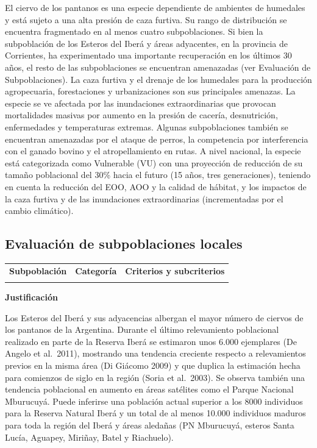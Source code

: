 \documentclass[
]{article}
\begin{document}
El ciervo de los pantanos es una especie dependiente de ambientes de
humedales y está sujeto a una alta presión de caza furtiva. Su rango de
distribución se encuentra fragmentado en al menos cuatro subpoblaciones.
Si bien la subpoblación de los Esteros del Iberá y áreas adyacentes, en
la provincia de Corrientes, ha experimentado una importante recuperación
en los últimos 30 años, el resto de las subpoblaciones se encuentran
amenazadas (ver Evaluación de Subpoblaciones). La caza furtiva y el
drenaje de los humedales para la producción agropecuaria, forestaciones
y urbanizaciones son sus principales amenazas. La especie se ve afectada
por las inundaciones extraordinarias que provocan mortalidades masivas
por aumento en la presión de cacería, desnutrición, enfermedades y
temperaturas extremas. Algunas subpoblaciones también se encuentran
amenazadas por el ataque de perros, la competencia por interferencia con
el ganado bovino y el atropellamiento en rutas. A nivel nacional, la
especie está categorizada como Vulnerable (VU) con una proyección de
reducción de su tamaño poblacional del 30\% hacia el futuro (15 años,
tres generaciones), teniendo en cuenta la reducción del EOO, AOO y la
calidad de hábitat, y los impactos de la caza furtiva y de las
inundaciones extraordinarias (incrementadas por el cambio climático).

\hypertarget{evaluaciuxf3n-de-subpoblaciones-locales}{%
\subsection{\texorpdfstring{\textbf{Evaluación de subpoblaciones
locales}}{Evaluación de subpoblaciones locales}}\label{evaluaciuxf3n-de-subpoblaciones-locales}}

\begin{tabu} to 
\toprule
\textbf{Subpoblación} & \textbf{Categoría} & \textbf{Criterios y subcriterios}\\
\midrule
{} &  & \\
\bottomrule
\end{tabu}

\textbf{Justificación}

Los Esteros del Iberá y sus adyacencias albergan el mayor número de
ciervos de los pantanos de la Argentina. Durante el último relevamiento
poblacional realizado en parte de la Reserva Iberá se estimaron unos
6.000 ejemplares (De Angelo et al.~2011), mostrando una tendencia
creciente respecto a relevamientos previos en la misma área (Di Giácomo
2009) y que duplica la estimación hecha para comienzos de siglo en la
región (Soria et al.~2003). Se observa también una tendencia poblacional
en aumento en áreas satélites como el Parque Nacional Mburucuyá. Puede
inferirse una población actual superior a los 8000 individuos para la
Reserva Natural Iberá y un total de al menos 10.000 individuos maduros
para toda la región del Iberá y áreas aledañas (PN Mburucuyá, esteros
Santa Lucía, Aguapey, Miriñay, Batel y Riachuelo).
\end{document}
